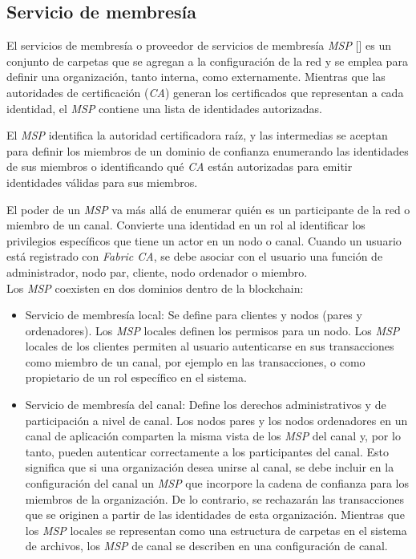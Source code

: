 \subsection{Servicio de membres\'ia}
El servicios de membres\'ia o proveedor de servicios de membres\'ia \emph{MSP} [\cite{MSP}] es un conjunto de carpetas que se agregan a la configuraci\'on de la red y se emplea para definir una organizaci\'on, tanto interna, como externamente. Mientras que las autoridades de certificaci\'on (\emph{CA}) generan los certificados que representan a cada identidad, el \emph{MSP} contiene una lista de identidades autorizadas.

El \emph{MSP} identifica la autoridad certificadora ra\'iz, y las intermedias se aceptan para definir los miembros de un dominio de confianza enumerando las identidades de sus miembros o identificando qu\'e \emph{CA} est\'an autorizadas para emitir identidades v\'alidas para sus miembros.

El poder de un \emph{MSP} va m\'as all\'a de enumerar qui\'en es un participante de la red o miembro de un canal. Convierte una identidad en un rol al identificar los privilegios espec\'ificos que tiene un actor en un nodo o canal. Cuando un usuario est\'a registrado con \emph{Fabric CA}, se debe asociar con el usuario una funci\'on de administrador, nodo par, cliente, nodo ordenador o miembro.\\ 


Los \emph{MSP} coexisten en dos dominios dentro de la blockchain:
\begin{itemize}
\item Servicio de membres\'ia local: Se define para clientes y nodos (pares y ordenadores). Los \emph{MSP} locales definen los permisos para un nodo. Los \emph{MSP} locales de los clientes permiten al usuario autenticarse en sus transacciones como miembro de un canal, por ejemplo en las transacciones, o como propietario de un rol espec\'ifico en el sistema.

\item Servicio de membres\'ia del canal: Define los derechos administrativos y de participaci\'on a nivel de canal. Los nodos pares y los nodos ordenadores en un canal de aplicaci\'on comparten la misma vista de los \emph{MSP} del canal y, por lo tanto, pueden autenticar correctamente a los participantes del canal. Esto significa que si una organizaci\'on desea unirse al canal, se debe incluir en la configuraci\'on del canal un \emph{MSP} que incorpore la cadena de confianza para los miembros de la organizaci\'on. De lo contrario, se rechazar\'an las transacciones que se originen a partir de las identidades de esta organizaci\'on. Mientras que los \emph{MSP} locales se representan como una estructura de carpetas en el sistema de archivos, los \emph{MSP} de canal se describen en una configuraci\'on de canal.
\end{itemize}

